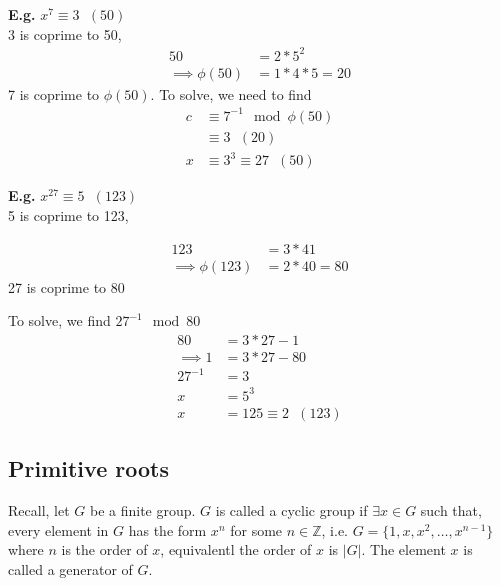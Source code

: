 \documentclass[11pt]{article}
\begin{document}
\textbf{E.g.} $x^7 \equiv 3\hspace{7pt}(50) $ 
\\3 is coprime to 50,
\begin{align*}
	50 &= 2*5^2 \\ \implies \phi(50) &= 1*4*5 = 20
\end{align*}
7 is coprime to $\phi(50)$. To solve, we need to find
\begin{align*}
	c &\equiv 7^{-1} \mod \phi(50)\\
	&\equiv 3 \hspace{7pt} (20) \\[1em]
	x &\equiv 3^3 \equiv 27\hspace{7pt} (50) 
\end{align*}


\textbf{E.g.} $x^{27} \equiv 5\hspace{7pt} (123)$\\
5 is coprime to 123,

\begin{align*}
	123 &= 3*41\\
	\implies \phi(123) &= 2*40 = 80
\end{align*}
27 is coprime to 80

To solve, we find $27^{-1} \mod 80$ 
\begin{align*}
	80 &= 3*27 - 1\\
	\implies 1 &= 3*27 - 80 \\[1em]
	27^{-1} &= 3\\[1em]
	x &= 5^3\\
	x &= 125 \equiv 2\hspace{7pt} (123)
\end{align*}

\subsection{Primitive roots}
Recall, let $G$ be a finite group. $G$ is called a cyclic group if $\exists x \in G$ such that, every element in $G$ has the form $x^n$ for some $n \in \mathbb{Z}$, i.e. $G = \{ 1,x,x^2, \dots , x^{n-1}\}$ where $n$ is the order of $x$, equivalentl the order of $x$ is $|G|$. The element $x$ is called a generator of $G$.
\end{document}
